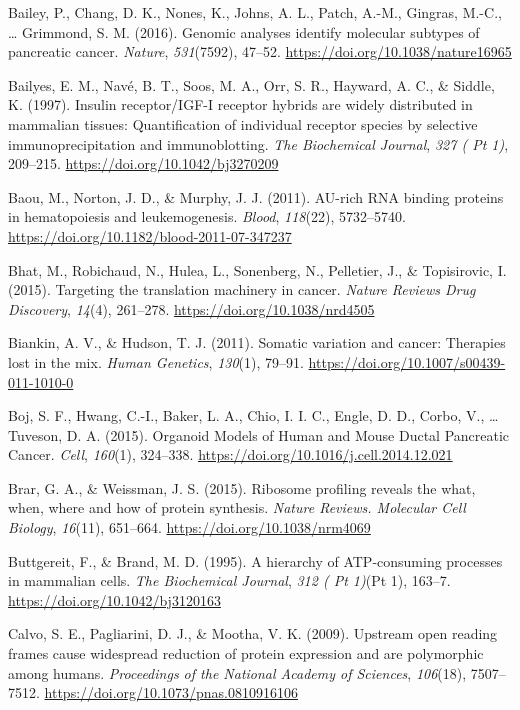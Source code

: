 \documentclass[12pt,openany]{book}
\begin{document}
\hypertarget{ref-Bailey2016}{}
Bailey, P., Chang, D. K., Nones, K., Johns, A. L., Patch, A.-M.,
Gingras, M.-C., \ldots{} Grimmond, S. M. (2016). Genomic analyses
identify molecular subtypes of pancreatic cancer. \emph{Nature},
\emph{531}(7592), 47--52. \url{https://doi.org/10.1038/nature16965}

\hypertarget{ref-Bailyes1997b}{}
Bailyes, E. M., Navé, B. T., Soos, M. A., Orr, S. R., Hayward, A. C., \&
Siddle, K. (1997). Insulin receptor/IGF-I receptor hybrids are widely
distributed in mammalian tissues: Quantification of individual receptor
species by selective immunoprecipitation and immunoblotting. \emph{The
Biochemical Journal}, \emph{327 ( Pt 1)}, 209--215.
\url{https://doi.org/10.1042/bj3270209}

\hypertarget{ref-Baou2011}{}
Baou, M., Norton, J. D., \& Murphy, J. J. (2011). AU-rich RNA binding
proteins in hematopoiesis and leukemogenesis. \emph{Blood},
\emph{118}(22), 5732--5740.
\url{https://doi.org/10.1182/blood-2011-07-347237}

\hypertarget{ref-Bhat2015}{}
Bhat, M., Robichaud, N., Hulea, L., Sonenberg, N., Pelletier, J., \&
Topisirovic, I. (2015). Targeting the translation machinery in cancer.
\emph{Nature Reviews Drug Discovery}, \emph{14}(4), 261--278.
\url{https://doi.org/10.1038/nrd4505}

\hypertarget{ref-Biankin2011}{}
Biankin, A. V., \& Hudson, T. J. (2011). Somatic variation and cancer:
Therapies lost in the mix. \emph{Human Genetics}, \emph{130}(1), 79--91.
\url{https://doi.org/10.1007/s00439-011-1010-0}

\hypertarget{ref-Boj2015}{}
Boj, S. F., Hwang, C.-I., Baker, L. A., Chio, I. I. C., Engle, D. D.,
Corbo, V., \ldots{} Tuveson, D. A. (2015). Organoid Models of Human and
Mouse Ductal Pancreatic Cancer. \emph{Cell}, \emph{160}(1), 324--338.
\url{https://doi.org/10.1016/j.cell.2014.12.021}

\hypertarget{ref-Brar2015}{}
Brar, G. A., \& Weissman, J. S. (2015). Ribosome profiling reveals the
what, when, where and how of protein synthesis. \emph{Nature Reviews.
Molecular Cell Biology}, \emph{16}(11), 651--664.
\url{https://doi.org/10.1038/nrm4069}

\hypertarget{ref-Buttgereit1995}{}
Buttgereit, F., \& Brand, M. D. (1995). A hierarchy of ATP-consuming
processes in mammalian cells. \emph{The Biochemical Journal}, \emph{312
( Pt 1)}(Pt 1), 163--7. \url{https://doi.org/10.1042/bj3120163}

\hypertarget{ref-Calvo2009}{}
Calvo, S. E., Pagliarini, D. J., \& Mootha, V. K. (2009). Upstream open
reading frames cause widespread reduction of protein expression and are
polymorphic among humans. \emph{Proceedings of the National Academy of
Sciences}, \emph{106}(18), 7507--7512.
\url{https://doi.org/10.1073/pnas.0810916106}
\end{document}
